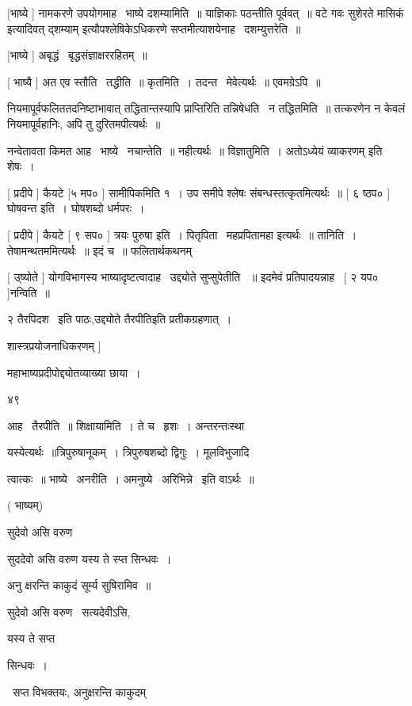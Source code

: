 \documentclass[11pt, openany]{book}
\begin{document}
 [भाष्ये ] नामकरणे उपयोगमाह \textendash\ भाष्ये दशम्यामिति~॥ याज्ञिकाः पठन्तीति
पूर्ववत्~॥ {\qt वटे गवः सुशेरते मासिकं} इत्यादिवत् {\qt द्शम्याम्}
इत्यौपश्लेषिकेऽधिकरणे सप्तमीत्याशयेनाह \textendash\ दशम्युत्तरेति~॥ 

 [भाष्ये ] अबृद्धं \textendash\ बृद्धसंज्ञाक्षररहितम्~॥ 

 [ भाष्यै ] अत एव स्तौति \textendash\ तद्धीति~॥ कृतमिति~। तदन्त \textendash\ मेवेत्यर्थः~॥
एवमग्रेऽपि~॥ 

 नियमापूर्वफलिततदनिष्टाभावात् तद्धितान्तस्यापि प्राप्तिरिति
तन्निषेधति \textendash\ न तद्धितमिति~॥ तत्करणेन न केवलं नियमापूर्वहानिः, अपि तु
दुरितमपीत्यर्थः~॥ 

 नन्वेतावता किमत आह \textendash\ भाष्ये \textendash\ नचान्तेति~॥ नहीत्यर्थः~॥ विज्ञातुमिति~। 
{\qt अतोऽध्येयं व्याकरणम्} इति शेषः~। 

 [ प्रदीपे ] कैयटे [५ मप० ] सामीपिकमिति १~। उप समीपे श्लेषः
संबन्धस्तत्कृतमित्यर्थः~॥ [ ६ ष्ठप० ] घोषवन्त इति~। घोषशब्दो
धर्मपरः~। 

 [ प्रदीपे ] कैयटे [ ९ सप० ] त्रयः पुरुषा इति~। पितृपिता \textendash\ 
महप्रपितामहा इत्यर्थः~॥ तानिति~। तेषामन्थतममित्यर्थः~॥ इदं च~॥
फलितार्थकथनम् 

 [ उ्ष्योते ] योगविभागस्य भाष्यादृष्टत्वादाह \textendash\ उद्द्योते सुप्सुपेतीति
~॥ इदमेवं प्रतिपादयन्नाह \textendash\ [ २ यप० ]नन्विति~॥ 





२ {\qt तैरपिदश} \textendash\ इति पाठः,उद्द्योते तैरपीतिइति प्रतीकग्रहणात्~। 

शास्त्रप्रयोजनाधिकरणम् ] 

महाभाष्यप्रदीपोद्द्योतव्याख्या छाया~। 

४९ 

आह \textendash\ तैरपीति~॥ शिक्षायामिति~। ते च \textendash\ हृशः~। अन्तरन्तःस्था 

यस्येत्यर्थः~॥त्रिपुरुषानूकम्~। त्रिपुरुषशब्दो द्विगुः~। मूलविभुजादि \textendash\ 


त्वात्कः~॥ भाष्ये \textendash\ अनरीति~। अमनुष्ये \textendash\ अरिभिन्ने \textendash\ इति वाऽर्थः~॥ 

( भाष्यम्) 

सुदेवो असि वरुण \textendash\ 

सुददेवो असि वरुण यस्य ते स्प्त सिन्धवः~। 

अनु क्षरन्ति काकुदं सूर्म्य सुषिरामिव~॥

{\qt सुदेवो असि वरुण} \textendash\ सत्यदेवीऽसि, {\qt यस्य ते सप्त 

सिन्धवः~।} \textendash\ सप्त विभक्तयः, {\qt अनुक्षरन्ति काकुदम्}
\end{document}
